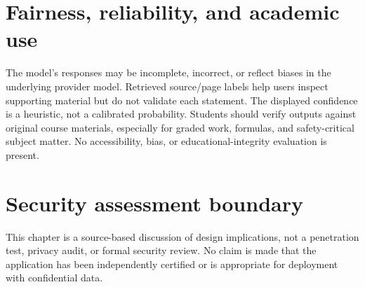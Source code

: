 \section{Fairness, reliability, and academic use}
The model's responses may be incomplete, incorrect, or reflect biases in the underlying provider model. Retrieved source/page labels help users inspect supporting material but do not validate each statement. The displayed confidence is a heuristic, not a calibrated probability. Students should verify outputs against original course materials, especially for graded work, formulas, and safety-critical subject matter. No accessibility, bias, or educational-integrity evaluation is present.

\section{Security assessment boundary}
This chapter is a source-based discussion of design implications, not a penetration test, privacy audit, or formal security review. No claim is made that the application has been independently certified or is appropriate for deployment with confidential data.

